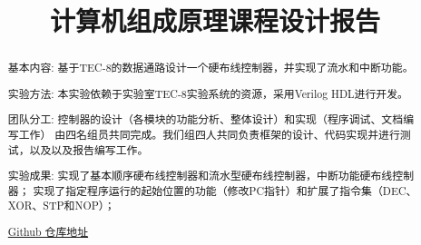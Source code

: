 \documentclass{mcmthesis}
\title{\LARGE\textbf{计算机组成原理课程设计报告}} %
\begin{document}
\begin{abstract}
  \par
  基本内容: 基于TEC-8的数据通路设计一个硬布线控制器，并实现了流水和中断功能。
  \par
  实验方法: 本实验依赖于实验室TEC-8实验系统的资源，采用Verilog HDL进行开发。
  \par
  团队分工: 控制器的设计（各模块的功能分析、整体设计）和实现（程序调试、文档编写工作）
  由四名组员共同完成。我们组四人共同负责框架的设计、代码实现并进行测试，以及以及报告编写工作。
  \par
  实验成果: 实现了基本顺序硬布线控制器和流水型硬布线控制器，中断功能硬布线控制器；
  实现了指定程序运行的起始位置的功能（修改PC指针）和扩展了指令集（DEC、XOR、STP和NOP）；
  \par
  \par
  \href{https://github.com/Micuks/Principles_of_Computer_Organization_Course_Design}{Github 仓库地址}
\end{abstract}
\maketitle
\tableofcontents
\pagebreak






% 
\end{document}
